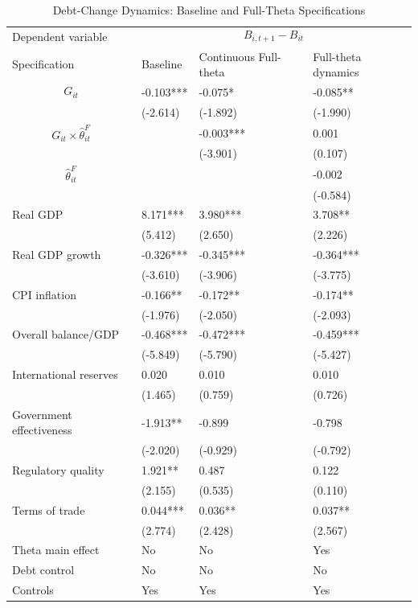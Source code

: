 \begin{table}[H]\centering
\begin{threeparttable}
\caption{Debt-Change Dynamics: Baseline and Full-Theta Specifications}
\label{tab:debt_change_combined_fulltheta}
\scriptsize
\begin{tabularx}{\textwidth}{lYYY}
\toprule
Dependent variable &  \\
\cmidrule(lr){2-4}
Specification & Baseline & Continuous Full-theta & Full-theta dynamics \\
\midrule
$$G_{it}$$ & -0.103*** & -0.075* & -0.085** \\
 & (-2.614) & (-1.892) & (-1.990) \\
$$G_{it}\times\widehat{\theta}^{F}_{it}$$ &  & -0.003*** & 0.001 \\
 &  & (-3.901) & (0.107) \\
$$\widehat{\theta}^{F}_{it}$$ &  &  & -0.002 \\
 &  &  & (-0.584) \\
Real GDP & 8.171*** & 3.980*** & 3.708** \\
 & (5.412) & (2.650) & (2.226) \\
Real GDP growth & -0.326*** & -0.345*** & -0.364*** \\
 & (-3.610) & (-3.906) & (-3.775) \\
CPI inflation & -0.166** & -0.172** & -0.174** \\
 & (-1.976) & (-2.050) & (-2.093) \\
Overall balance/GDP & -0.468*** & -0.472*** & -0.459*** \\
 & (-5.849) & (-5.790) & (-5.427) \\
International reserves & 0.020 & 0.010 & 0.010 \\
 & (1.465) & (0.759) & (0.726) \\
Government effectiveness & -1.913** & -0.899 & -0.798 \\
 & (-2.020) & (-0.929) & (-0.792) \\
Regulatory quality & 1.921** & 0.487 & 0.122 \\
 & (2.155) & (0.535) & (0.110) \\
Terms of trade & 0.044*** & 0.036** & 0.037** \\
 & (2.774) & (2.428) & (2.567) \\
\midrule
Theta main effect & No & No & Yes \\
Debt control & No & No & No \\
Controls & Yes & Yes & Yes \\

\end{tabularx}
\end{threeparttable}
\end{table}
